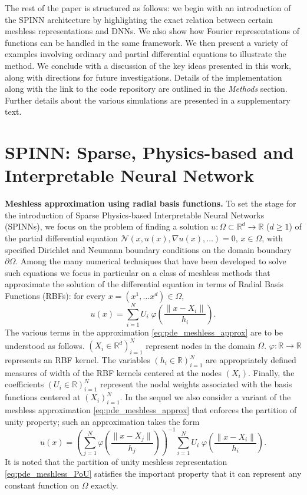 \documentclass[12pt]{article}
\begin{document}
The rest of the paper is structured as follows: we begin with an introduction of the SPINN architecture by highlighting the exact relation between certain meshless representations and DNNs. We also show how Fourier representations of functions can be handled in the same framework. We then present a variety of examples involving ordinary and partial differential equations to illustrate the method. We conclude with a discussion of the key ideas presented in this work, along with directions for future investigations. Details of the implementation along with the link to the code repository are outlined in the \emph{Methods} section. Further details about the various simulations are presented in a supplementary text.

\section*{SPINN: Sparse, Physics-based and Interpretable Neural Network}

\textbf{Meshless approximation using radial basis functions.} To set the stage for the introduction of Sparse Physics-based Interpretable Neural Networks (SPINNs), we focus on the problem of finding a solution $u:\Omega \subset \mathbb{R}^d \to \mathbb{R}$ ($d \ge 1$) of the partial differential equation $\mathcal{N}(x, u(x), \nabla u(x), \ldots) = 0$, $x \in \Omega$, with specified Dirichlet and Neumann boundary conditions on the domain boundary $\partial \Omega$. Among the many numerical techniques that have been developed to solve such equations we focus in particular on a class of meshless methods that approximate the solution of the differential equation in terms of Radial Basis Functions (RBFs): for every $x = (x^1, \ldots x^d) \in \Omega$,
\begin{equation} \label{eq:pde_meshless_approx}
u(x) = \sum_{i=1}^N U_i \; \varphi\left(\frac{\lVert x - X_i \rVert}{h_i}\right).
\end{equation}
The various terms in the approximation \eqref{eq:pde_meshless_approx} are to be understood as follows. $(X_i \in \mathbb{R}^d)_{i=1}^N$ represent nodes in the domain $\Omega$. $\varphi:\mathbb{R}\to \mathbb{R}$ represents an RBF kernel. The variables $(h_i \in \mathbb{R})_{i=1}^N$ are appropriately defined measures of width of the RBF kernels centered at the nodes $(X_i)$. Finally, the coefficients $(U_i \in \mathbb{R})_{i=1}^N$ represent the nodal weights associated with the basis functions centered at $(X_i)_{i=1}^N$. In the sequel we also consider a variant of the meshless approximation \eqref{eq:pde_meshless_approx} that enforces the partition of unity property; such an approximation takes the form
\begin{equation} \label{eq:pde_meshless_PoU}
u(x) = \left(\sum_{j=1}^N \varphi\left(\frac{\lVert x - X_j \rVert}{h_j}\right)\right)^{-1}\sum_{i=1}^N U_i  \; \varphi\left(\frac{\lVert x - X_i \rVert}{h_i}\right).
\end{equation}
It is noted that the partition of unity meshless representation \eqref{eq:pde_meshless_PoU} satisfies the important property that it can represent any constant function on $\Omega$ exactly.
\end{document}
